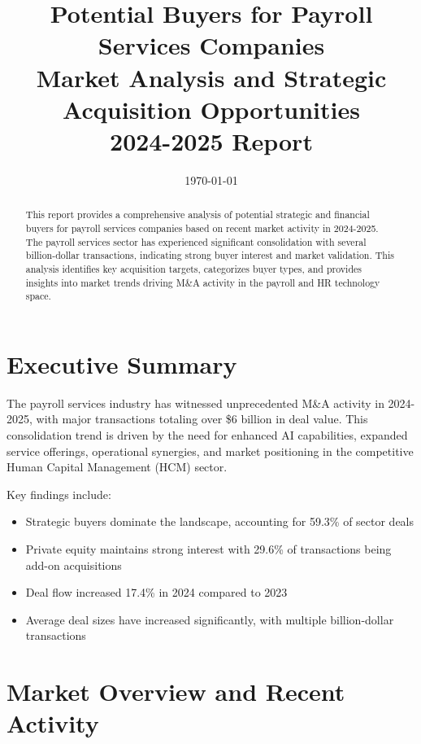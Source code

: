 \documentclass[12pt,a4paper]{article}
\title{\textbf{\huge Potential Buyers for Payroll Services Companies} \\ 
       \large Market Analysis and Strategic Acquisition Opportunities \\
       \large 2024-2025 Report}
\author{}
\date{\today}
\begin{document}
\maketitle

\thispagestyle{empty}

\vspace{1cm}

\begin{abstract}
This report provides a comprehensive analysis of potential strategic and financial buyers for payroll services companies based on recent market activity in 2024-2025. The payroll services sector has experienced significant consolidation with several billion-dollar transactions, indicating strong buyer interest and market validation. This analysis identifies key acquisition targets, categorizes buyer types, and provides insights into market trends driving M\&A activity in the payroll and HR technology space.
\end{abstract}

\newpage

\tableofcontents

\newpage

\section{Executive Summary}

The payroll services industry has witnessed unprecedented M\&A activity in 2024-2025, with major transactions totaling over \$6 billion in deal value. This consolidation trend is driven by the need for enhanced AI capabilities, expanded service offerings, operational synergies, and market positioning in the competitive Human Capital Management (HCM) sector.

Key findings include:
\begin{itemize}
    \item Strategic buyers dominate the landscape, accounting for 59.3\% of sector deals
    \item Private equity maintains strong interest with 29.6\% of transactions being add-on acquisitions
    \item Deal flow increased 17.4\% in 2024 compared to 2023
    \item Average deal sizes have increased significantly, with multiple billion-dollar transactions
\end{itemize}

\section{Market Overview and Recent Activity}
\end{document}
